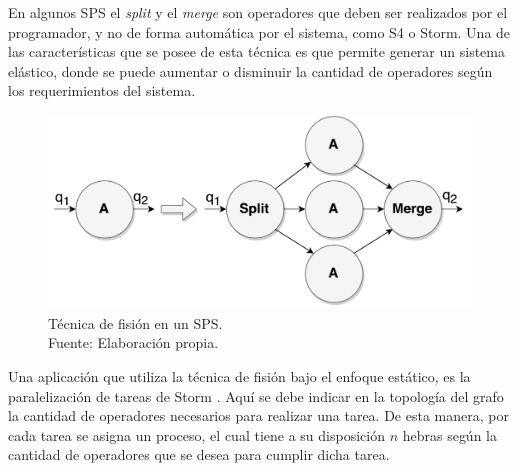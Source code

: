 En algunos SPS el \textit{split} y el \textit{merge} son operadores que deben ser realizados por el programador, y no de forma autom\'atica por el sistema, como S4 o Storm. Una de las caracter\'isticas que se posee de esta t\'ecnica es que permite generar un sistema el\'astico, donde se puede aumentar o disminuir la cantidad de operadores seg\'un los requerimientos del sistema.

\begin{figure}[!ht]
	\centering
	\includegraphics[scale=0.4]{images/Fision.pdf}
	\caption[T\'ecnica de fisi\'on en un SPS.]{T\'ecnica de fisi\'on en un SPS.\\Fuente: Elaboraci\'on propia.}
	\label{fig:fision}
\end{figure}



Una aplicaci\'on que utiliza la t\'ecnica de fisi\'on bajo el enfoque est\'atico, es la paralelizaci\'on de tareas de Storm \citep{bookstorm}. Aqu\'i se debe indicar en la topolog\'ia del grafo la cantidad de operadores necesarios para realizar una tarea. De esta manera, por cada tarea se asigna un proceso, el cual tiene a su disposici\'on $n$ hebras seg\'un la cantidad de operadores que se desea para cumplir dicha tarea.


